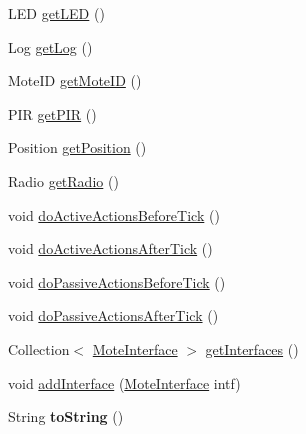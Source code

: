 \begin{DoxyCompactItemize}
\item 
L\-E\-D \hyperlink{classorg_1_1contikios_1_1cooja_1_1MoteInterfaceHandler_af9047c7f930b323a2bbd50beffe765f6}{get\-L\-E\-D} ()
\item 
Log \hyperlink{classorg_1_1contikios_1_1cooja_1_1MoteInterfaceHandler_a276edc9b54ed8549fd87b9f277118425}{get\-Log} ()
\item 
Mote\-I\-D \hyperlink{classorg_1_1contikios_1_1cooja_1_1MoteInterfaceHandler_a56e8ce372387424d3b76028e1bbc57c1}{get\-Mote\-I\-D} ()
\item 
P\-I\-R \hyperlink{classorg_1_1contikios_1_1cooja_1_1MoteInterfaceHandler_acde7bd2213e31bb044ebabe2dba27b16}{get\-P\-I\-R} ()
\item 
Position \hyperlink{classorg_1_1contikios_1_1cooja_1_1MoteInterfaceHandler_af6f171cc7e1fabb767f01ed70b8abaa9}{get\-Position} ()
\item 
Radio \hyperlink{classorg_1_1contikios_1_1cooja_1_1MoteInterfaceHandler_ab92cd221205b88b9f4ff34af051e5a8b}{get\-Radio} ()
\item 
void \hyperlink{classorg_1_1contikios_1_1cooja_1_1MoteInterfaceHandler_adb6e3304cc2a03769f61d3c51d84a439}{do\-Active\-Actions\-Before\-Tick} ()
\item 
void \hyperlink{classorg_1_1contikios_1_1cooja_1_1MoteInterfaceHandler_a40a6028e66b1d569b08290a0784aabe4}{do\-Active\-Actions\-After\-Tick} ()
\item 
void \hyperlink{classorg_1_1contikios_1_1cooja_1_1MoteInterfaceHandler_a13aaf685033814db9359c920e74261f0}{do\-Passive\-Actions\-Before\-Tick} ()
\item 
void \hyperlink{classorg_1_1contikios_1_1cooja_1_1MoteInterfaceHandler_a665063232706a8ca1fd7d9c1f00861b5}{do\-Passive\-Actions\-After\-Tick} ()
\item 
Collection$<$ \hyperlink{classorg_1_1contikios_1_1cooja_1_1MoteInterface}{Mote\-Interface} $>$ \hyperlink{classorg_1_1contikios_1_1cooja_1_1MoteInterfaceHandler_a1b3ea0eadba6762d997dfb6468c2e209}{get\-Interfaces} ()
\item 
void \hyperlink{classorg_1_1contikios_1_1cooja_1_1MoteInterfaceHandler_abca4b46a75c6d9f166bd12fa56a4a095}{add\-Interface} (\hyperlink{classorg_1_1contikios_1_1cooja_1_1MoteInterface}{Mote\-Interface} intf)
\item 
\hypertarget{classorg_1_1contikios_1_1cooja_1_1MoteInterfaceHandler_a710acc6a3d3077e61f9b3b3c467d49d2}{String {\bfseries to\-String} ()}\label{classorg_1_1contikios_1_1cooja_1_1MoteInterfaceHandler_a710acc6a3d3077e61f9b3b3c467d49d2}

\end{DoxyCompactItemize}


